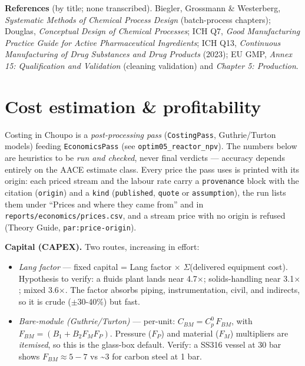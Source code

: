 \documentclass[11pt,a4paper]{article}
\providecommand{\tightlist}{\setlength{\itemsep}{0pt}\setlength{\parskip}{0pt}}
\begin{document}
\textbf{References} (by title; none transcribed). Biegler, Grossmann \&
Westerberg, \emph{Systematic Methods of Chemical Process Design}
(batch-process chapters); Douglas, \emph{Conceptual Design of Chemical
Processes}; ICH Q7, \emph{Good Manufacturing Practice Guide for Active
Pharmaceutical Ingredients}; ICH Q13, \emph{Continuous Manufacturing of
Drug Substances and Drug Products} (2023); EU GMP, \emph{Annex 15:
Qualification and Validation} (cleaning validation) and \emph{Chapter 5:
Production}.

\hypertarget{cost-estimation--profitability}{%
\section{Cost estimation \&
profitability}\label{cost-estimation--profitability}}

Costing in Choupo is a \emph{post-processing pass}
(\texttt{CostingPass}, Guthrie/Turton models) feeding
\texttt{EconomicsPass} (see \texttt{optim05\_reactor\_npv}). The numbers
below are heuristics to be \emph{run and checked}, never final verdicts
--- accuracy depends entirely on the AACE estimate class.
Every price the pass uses is printed with its origin: each priced stream
and the labour rate carry a \texttt{provenance} block with the citation
(\texttt{origin}) and a \texttt{kind} (\texttt{published}, \texttt{quote} or
\texttt{assumption}), the run lists them under ``Prices and where they came
from'' and in \texttt{reports/economics/prices.csv}, and a stream price with no
origin is refused (Theory Guide, \texttt{par:price-origin}).

\textbf{Capital (CAPEX).} Two routes, increasing in effort:

\begin{itemize}
\tightlist
\item
  \emph{Lang factor} --- fixed capital = Lang factor \(\times\) \(\Sigma\)(delivered
  equipment cost). Hypothesis to verify: a fluids plant lands near 4.7\(\times\);
  solids-handling near 3.1\(\times\); mixed 3.6\(\times\). The factor absorbs piping,
  instrumentation, civil, and indirects, so it is crude (\(\pm\)30-40\%) but
  fast.
\item
  \emph{Bare-module (Guthrie/Turton)} --- per-unit:
  \(C_{BM}=C_p^0\,F_{BM}\), with \(F_{BM}=(B_1+B_2 F_M F_P)\). Pressure
  (\(F_P\)) and material (\(F_M\)) multipliers are \emph{itemised}, so
  this is the glass-box default. Verify: a SS316 vessel at 30 bar shows
  \(F_{BM}\approx 5-7\) vs \textasciitilde3 for carbon steel at 1 bar.
\end{itemize}
\end{document}
